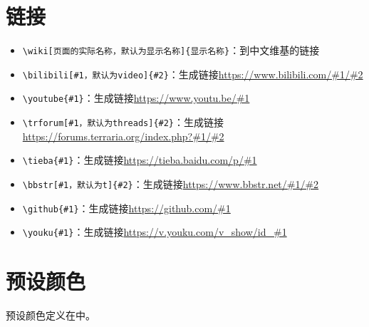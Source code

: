 \section{链接}
\begin{itemize}
  \item \lstinline|\wiki[页面的实际名称，默认为显示名称]{显示名称}|：到\termTR 中文维基的链接
  \item \lstinline|\bilibili[#1，默认为video]{#2}|：生成链接\url{https://www.bilibili.com/#1/#2}
  \item \lstinline|\youtube{#1}|：生成链接\url{https://www.youtu.be/#1}
  \item \lstinline|\trforum[#1，默认为threads]{#2}|：生成链接\url{https://forums.terraria.org/index.php?#1/#2}
  \item \lstinline|\tieba{#1}|：生成链接\url{https://tieba.baidu.com/p/#1}
  \item \lstinline|\bbstr[#1，默认为t]{#2}|：生成链接\url{https://www.bbstr.net/#1/#2}
  \item \lstinline|\github{#1}|：生成链接\url{https://github.com/#1}
  \item \lstinline|\youku{#1}|：生成链接\url{https://v.youku.com/v_show/id_#1}
\end{itemize}

\section{预设颜色}

预设颜色定义在中。


